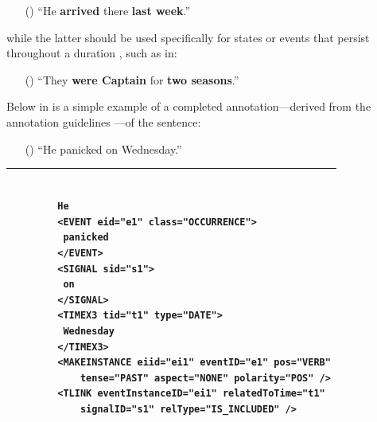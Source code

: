 \documentclass[a4paper,12pt,leqno,twoside]{article}
\newcommand{\ipp}{(\refstepcounter{equation}\theequation)}
\begin{document}
\begin{itemize}
	\item[\ipp] ``He \textbf{arrived} there \textbf{last week}.''
\end{itemize}
while the latter should be used specifically for states or events that persist throughout a duration \citep[p. 158]{Pustejovsky2005}, such as in:
\begin{itemize}
	\item[\ipp] ``They \textbf{were Captain} for \textbf{two seasons}.''
\end{itemize}
Below in  is a simple example of a completed annotation---derived from the annotation guidelines \citep{sauri2006timeml}---of the sentence:
\begin{itemize}
	\item[\ipp] ``He panicked on Wednesday.''
\end{itemize}
\begin{center}
	\onehalfspacing
	\begin{tabular}[h!]{|l|}
		\hline
		\begin{minipage}{0.75\textwidth}
		\begin{verbatim}

		He
		<EVENT eid="e1" class="OCCURRENCE">
		 panicked
		</EVENT>
		<SIGNAL sid="s1">
		 on
		</SIGNAL>
		<TIMEX3 tid="t1" type="DATE">
		 Wednesday
		</TIMEX3>
		<MAKEINSTANCE eiid="ei1" eventID="e1" pos="VERB"
			tense="PAST" aspect="NONE" polarity="POS" />
		<TLINK eventInstanceID="ei1" relatedToTime="t1"
			signalID="s1" relType="IS_INCLUDED" />

		\end{verbatim}
		\end{minipage}\\
		\hline
	\end{tabular}
	\label{fig:example-timeml-annotation}
\end{center}
\end{document}
